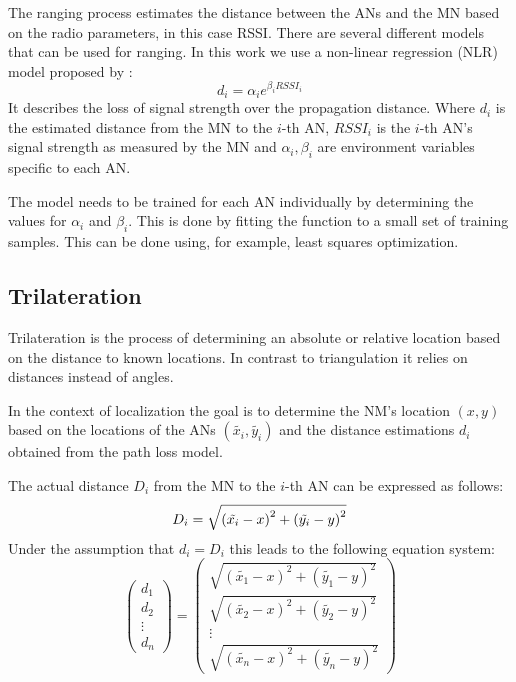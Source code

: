 The ranging process estimates the distance between the ANs and the MN based on the radio parameters, in this case RSSI. There are several different models that can be used for ranging. In this work we use a non-linear regression (NLR) model proposed by \cite{li2015passiveWIFIsource}:
\begin{equation} \label{eqn:non-linear path loss model}
d_{i}=\alpha_{i}e^{\beta_{i}RSSI_{i}}
\end{equation}
It describes the loss of signal strength over the propagation distance. Where \(d_{i}\) is the estimated distance from the MN to the \(i\)-th AN, \(RSSI_{i}\) is the \(i\)-th AN's signal strength as measured by the MN and \(\alpha_{i}, \beta_{i}\) are environment variables specific to each AN.

The model needs to be trained for each AN individually by determining the values for \(\alpha_{i}\) and \(\beta_{i}\). This is done by fitting the function to a small set of training samples. This can be done using, for example, least squares optimization.

\subsection{Trilateration}

Trilateration is the process of determining an absolute or relative location based on the distance to known locations. In contrast to triangulation it relies on distances instead of angles.

In the context of localization the goal is to determine the NM's location \(\left ( x,y \right )\) based on the locations of the ANs \(\left ( \tilde{x_{i}},\tilde{y_{i}} \right )\) and the distance estimations \(d_{i}\) obtained from the path loss model.

The actual distance \(D_{i}\) from the MN to the \(i\)-th AN can be expressed as follows:
\begin{equation}
D_{i} = \sqrt{\left ( \tilde{x_{i}}-x \right )^{2}+\left ( \tilde{y_{i}}-y \right )^{2}}
\label{eqn: distance MN to AN_{i}}
\end{equation}
Under the assumption that \(d_{i}=D_{i}\) this leads to the following equation system:
\begin{equation}
\begin{pmatrix}
d_{1}\\
d_{2}\\
\vdots\\
d_{n}
\end{pmatrix}
=
\begin{pmatrix}
\sqrt{\left ( \tilde{x_{1}}-x \right )^{2}+\left ( \tilde{y_{1}}-y \right )^{2}}\\
\sqrt{\left ( \tilde{x_{2}}-x \right )^{2}+\left ( \tilde{y_{2}}-y \right )^{2}} \\
\vdots\\
\sqrt{\left ( \tilde{x_{n}}-x \right )^{2}+\left ( \tilde{y_{n}}-y \right )^{2}}
\end{pmatrix}
\label{eqn: trilateration problem as equation system}
\end{equation}

